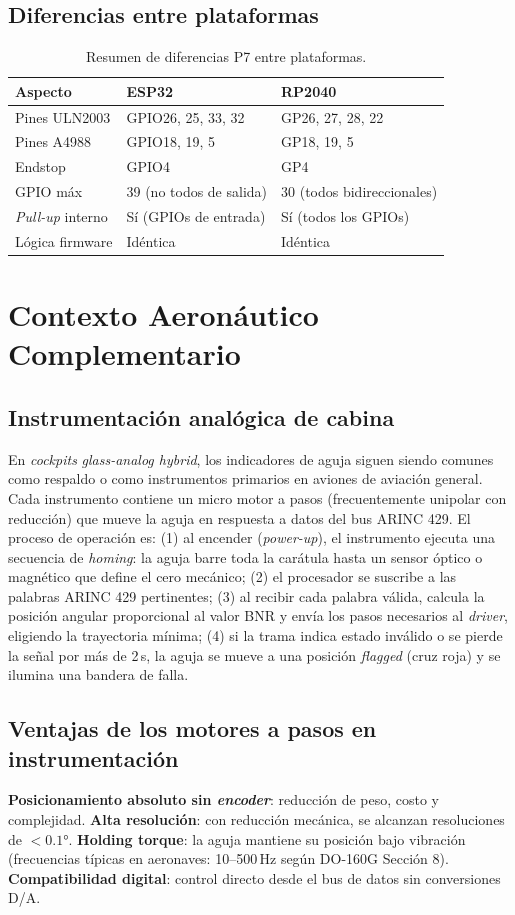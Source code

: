 \documentclass[11pt]{article}
\begin{document}
\subsection{Diferencias entre plataformas}
\begin{table}[H]\centering
\caption{Resumen de diferencias P7 entre plataformas.}
\begin{tabular}{lll}
\toprule
Aspecto & ESP32 & RP2040 \\
\midrule
Pines ULN2003 & GPIO26, 25, 33, 32 & GP26, 27, 28, 22 \\
Pines A4988 & GPIO18, 19, 5 & GP18, 19, 5 \\
Endstop & GPIO4 & GP4 \\
GPIO máx & 39 (no todos de salida) & 30 (todos bidireccionales) \\
\emph{Pull-up} interno & Sí (GPIOs de entrada) & Sí (todos los GPIOs) \\
Lógica firmware & Idéntica & Idéntica \\
\bottomrule
\end{tabular}
\end{table}

\section{Contexto Aeronáutico Complementario}
\subsection{Instrumentación analógica de cabina}
En \emph{cockpits} \emph{glass-analog hybrid}, los indicadores de aguja siguen siendo
comunes como respaldo o como instrumentos primarios en aviones de aviación general. Cada
instrumento contiene un micro motor a pasos (frecuentemente unipolar con reducción) que
mueve la aguja en respuesta a datos del bus ARINC 429. El proceso de operación es: (1) al
encender (\emph{power-up}), el instrumento ejecuta una secuencia de \emph{homing}: la
aguja barre toda la carátula hasta un sensor óptico o magnético que define el cero
mecánico; (2) el procesador se suscribe a las palabras ARINC 429 pertinentes; (3) al
recibir cada palabra válida, calcula la posición angular proporcional al valor BNR y
envía los pasos necesarios al \emph{driver}, eligiendo la trayectoria mínima; (4) si la
trama indica estado inválido o se pierde la señal por más de 2\,s, la aguja se mueve a
una posición \emph{flagged} (cruz roja) y se ilumina una bandera de falla.

\subsection{Ventajas de los motores a pasos en instrumentación}
\textbf{Posicionamiento absoluto sin \emph{encoder}}: reducción de peso, costo y
complejidad. \textbf{Alta resolución}: con reducción mecánica, se alcanzan resoluciones
de $<0.1\si{\degree}$. \textbf{Holding torque}: la aguja mantiene su posición bajo
vibración (frecuencias típicas en aeronaves: 10--500\,Hz según DO-160G Sección 8).
\textbf{Compatibilidad digital}: control directo desde el bus de datos sin conversiones
D/A.
\end{document}
